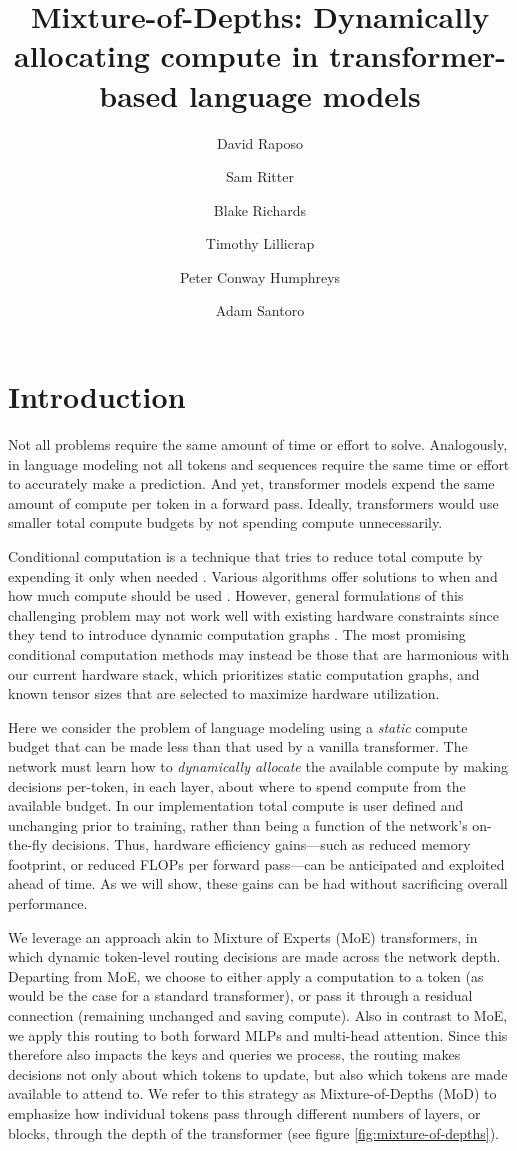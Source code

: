 \documentclass[11pt, a4paper, onecolumn, logo, copyright]{googledeepmind}
\title{Mixture-of-Depths: Dynamically allocating compute in transformer-based language models}
\author[1*]{David Raposo}
\author[1]{Sam Ritter}
\author[1,2]{Blake Richards}
\author[1]{Timothy Lillicrap}
\author[1]{Peter Conway Humphreys}
\author[1*]{Adam Santoro}
\affil[1]{Google DeepMind}
\affil[2]{McGill University \& Mila}
\affil[*]{Equal Contribution}
\begin{document}
\maketitle

\section{Introduction}
Not all problems require the same amount of time or effort to solve. Analogously, in language modeling not all tokens and sequences require the same time or effort to accurately make a prediction. And yet, transformer models expend the same amount of compute per token in a forward pass. Ideally, transformers would use smaller total compute budgets by not spending compute unnecessarily. 

Conditional computation is a technique that tries to reduce total compute by expending it only when needed \citep{bengio2013deep,bengio2013estimating,bengio2016conditional}. Various algorithms offer solutions to when and how much compute should be used \citep{ainslie2023colt5, fedus2022switch, bapna_controlling}. However, general formulations of this challenging problem may not work well with existing hardware constraints since they tend to introduce dynamic computation graphs \citep{graves_adaptive, dehghani2018universal}. The most promising conditional computation methods may instead be those that are harmonious with our current hardware stack, which prioritizes static computation graphs, and known tensor sizes that are selected to maximize hardware utilization.

Here we consider the problem of language modeling using a \textit{static} compute budget that can be made less than that used by a vanilla transformer. The network must learn how to \textit{dynamically allocate} the available compute by making decisions per-token, in each layer, about where to spend compute from the available budget. In our implementation total compute is user defined and unchanging prior to training, rather than being a function of the network's on-the-fly decisions. Thus, hardware efficiency gains---such as reduced memory footprint, or reduced FLOPs per forward pass---can be anticipated and exploited ahead of time. As we will show, these gains can be had without sacrificing overall performance.

We leverage an approach akin to Mixture of Experts (MoE) transformers, in which dynamic token-level routing decisions are made across the network depth. Departing from MoE, we choose to either apply a computation to a token (as would be the case for a standard transformer), or pass it through a residual connection (remaining unchanged and saving compute). Also in contrast to MoE, we apply this routing to both forward MLPs and multi-head attention. Since this therefore also impacts the keys and queries we process, the routing makes decisions not only about which tokens to update, but also which tokens are made available to attend to. We refer to this strategy as Mixture-of-Depths (MoD) to emphasize how individual tokens pass through different numbers of layers, or blocks, through the depth of the transformer (see figure \ref{fig:mixture-of-depths}).
\end{document}
